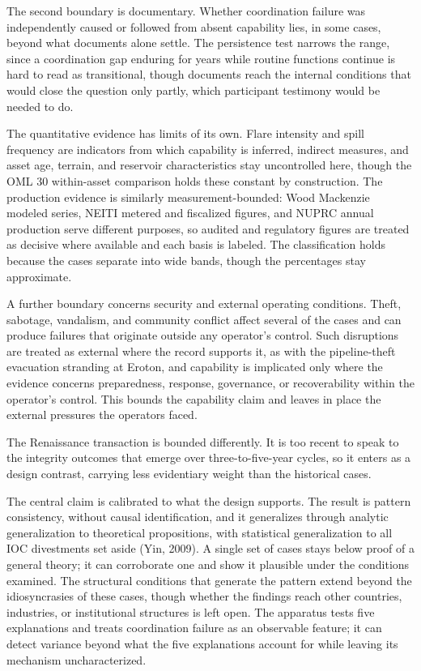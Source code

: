 The second boundary is documentary. Whether coordination failure was
independently caused or followed from absent capability lies, in some
cases, beyond what documents alone settle. The persistence test narrows
the range, since a coordination gap enduring for years while routine
functions continue is hard to read as transitional, though documents
reach the internal conditions that would close the question only partly,
which participant testimony would be needed to do.

The quantitative evidence has limits of its own. Flare intensity and
spill frequency are indicators from which capability is inferred,
indirect measures, and asset age, terrain, and reservoir characteristics
stay uncontrolled here, though the OML 30 within-asset comparison holds
these constant by construction. The production evidence is similarly
measurement-bounded: Wood Mackenzie modeled series, NEITI metered and
fiscalized figures, and NUPRC annual production serve different
purposes, so audited and regulatory figures are treated as decisive
where available and each basis is labeled. The classification holds
because the cases separate into wide bands, though the percentages stay
approximate.

A further boundary concerns security and external operating conditions.
Theft, sabotage, vandalism, and community conflict affect several of the
cases and can produce failures that originate outside any operator's
control. Such disruptions are treated as external where the record
supports it, as with the pipeline-theft evacuation stranding at Eroton,
and capability is implicated only where the evidence concerns
preparedness, response, governance, or recoverability within the
operator's control. This bounds the capability claim and leaves in place
the external pressures the operators faced.

The Renaissance transaction is bounded differently. It is too recent to
speak to the integrity outcomes that emerge over three-to-five-year
cycles, so it enters as a design contrast, carrying less evidentiary
weight than the historical cases.

The central claim is calibrated to what the design supports. The result
is pattern consistency, without causal identification, and it
generalizes through analytic generalization to theoretical propositions,
with statistical generalization to all IOC divestments set aside (Yin,
2009). A single set of cases stays below proof of a general theory; it
can corroborate one and show it plausible under the conditions examined.
The structural conditions that generate the pattern extend beyond the
idiosyncrasies of these cases, though whether the findings reach other
countries, industries, or institutional structures is left open. The
apparatus tests five explanations and treats coordination failure as an
observable feature; it can detect variance beyond what the five
explanations account for while leaving its mechanism uncharacterized.


